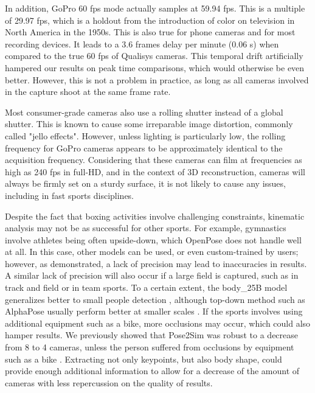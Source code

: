 In addition, GoPro 60 fps mode actually samples at 59.94 fps. This is a multiple of 29.97 fps, which is a holdout from the introduction of color on television in North America in the 1950s. This is also true for phone cameras and for most recording devices. It leads to a 3.6 frames delay per minute (0.06 s) when compared to the true 60 fps of Qualisys cameras. This temporal drift artificially hampered our results on peak time comparisons, which would otherwise be even better. However, this is not a problem in practice, as long as all cameras involved in the capture shoot at the same frame rate.

Most consumer-grade cameras also use a rolling shutter instead of a global shutter. This is known to cause some irreparable image distortion, commonly called "jello effects". However, unless lighting is particularly low, the rolling frequency for GoPro cameras appears to be approximately identical to the acquisition frequency. Considering that these cameras can film at frequencies as high as 240 fps in full-HD, and in the context of 3D reconstruction, cameras will always be firmly set on a sturdy surface, it is not likely to cause any issues, including in fast sports disciplines.

Despite the fact that boxing activities involve challenging constraints, kinematic analysis may not be as successful for other sports. For example, gymnastics involve athletes being often upside-down, which OpenPose does not handle well at all. In this case, other models can be used, or even custom-trained by users; however, as demonstrated, a lack of precision may lead to inaccuracies in results. A similar lack of precision will also occur if a large field is captured, such as in track and field or in team sports. To a certain extent, the body\_25B model generalizes better to small people detection \cite{Hidalgo2019}, although top-down method such as AlphaPose \cite{Fang2017} usually perform better at smaller scales \cite{Cao2019,Bridgeman2019}. If the sports involves using additional equipment such as a bike, more occlusions may occur, which could also hamper results. We previously showed that Pose2Sim was robust to a decrease from 8 to 4 cameras, unless the person suffered from occlusions by equipment such as a bike \cite{Pagnon2021}. Extracting not only keypoints, but also body shape, could provide enough additional information to allow for a decrease of the amount of cameras with less repercussion on the quality of results. 

